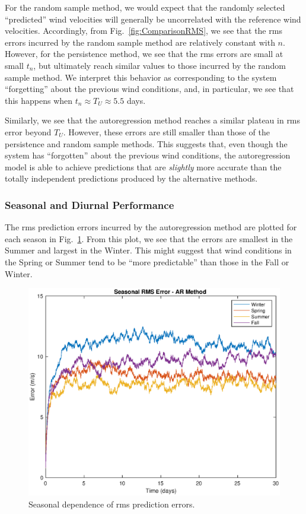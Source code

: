 \documentclass[11pt, oneside]{article}
\newcommand{\figref}[1]{Fig.~\ref{#1}}
\begin{document}
For the random sample method, we would expect that the randomly selected ``predicted'' wind velocities will generally be uncorrelated with the reference wind velocities.
Accordingly, from \figref{fig:ComparisonRMS}, we see that the rms errors incurred by the random sample method are relatively constant with $n$.
However, for the persistence method, we see that the rms errors are small at small $t_n$, but ultimately reach similar values to those incurred by the random sample method.
We interpret this behavior as corresponding to the system ``forgetting'' about the previous wind conditions, and, in particular, we see that this happens when $t_n \approx T_U \approx 5.5$ days.

Similarly, we see that the autoregression method reaches a similar plateau in rms error beyond $T_U$.
However, these errors are still smaller than those of the persistence and random sample methods.
This suggests that, even though the system has ``forgotten'' about the previous wind conditions, the autoregression model is able to achieve predictions that are \textit{slightly} more accurate than the totally independent predictions produced by the alternative methods.

\subsubsection{Seasonal and Diurnal Performance}
The rms prediction errors incurred by the autoregression method are plotted for each season in \figref{fig:SeasonalRMS}.
From this plot, we see that the errors are smallest in the Summer and largest in the Winter.
This might suggest that wind conditions in the Spring or Summer tend to be ``more predictable'' than those in the Fall or Winter.

\begin{figure}[htb]
\centering
\includegraphics[width=\columnwidth]{figures/SeasonalRMSPredictionError}
\caption{Seasonal dependence of rms prediction errors.}
\label{fig:SeasonalRMS}
\end{figure}
\end{document}
